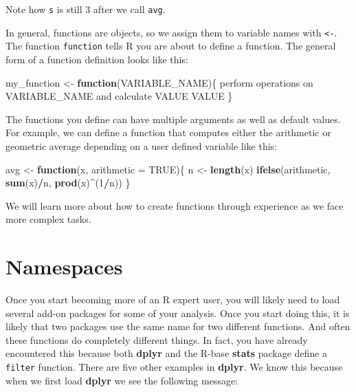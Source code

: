 \documentclass[
]{krantz}
\newenvironment{Shaded}{\begin{snugshade}}{\end{snugshade}}
\newcommand{\ControlFlowTok}[1]{\textcolor[rgb]{0.27,0.27,0.27}{\textbf{#1}}}
\newcommand{\DataTypeTok}[1]{\textcolor[rgb]{0.27,0.27,0.27}{#1}}
\newcommand{\DecValTok}[1]{\textcolor[rgb]{0.06,0.06,0.06}{#1}}
\newcommand{\KeywordTok}[1]{\textcolor[rgb]{0.27,0.27,0.27}{\textbf{#1}}}
\newcommand{\NormalTok}[1]{#1}
\newcommand{\OperatorTok}[1]{\textcolor[rgb]{0.43,0.43,0.43}{\textbf{#1}}}
\newcommand{\OtherTok}[1]{\textcolor[rgb]{0.37,0.37,0.37}{#1}}
\newcommand{\StringTok}[1]{\textcolor[rgb]{0.5,0.5,0.5}{#1}}
\begin{document}
Note how \texttt{s} is still 3 after we call \texttt{avg}.

In general, functions are objects, so we assign them to variable names with \texttt{\textless{}-}. The function \texttt{function} tells R you are about to define a function. The general form of a function definition looks like this:

\begin{Shaded}
\begin{Highlighting}[]
\NormalTok{my_function <-}\StringTok{ }\ControlFlowTok{function}\NormalTok{(VARIABLE_NAME)\{}
\NormalTok{  perform operations on VARIABLE_NAME and calculate VALUE}
\NormalTok{  VALUE}
\NormalTok{\}}
\end{Highlighting}
\end{Shaded}

The functions you define can have multiple arguments as well as default values. For example, we can define a function that computes either the arithmetic or geometric average depending on a user defined variable like this:

\begin{Shaded}
\begin{Highlighting}[]
\NormalTok{avg <-}\StringTok{ }\ControlFlowTok{function}\NormalTok{(x, }\DataTypeTok{arithmetic =} \OtherTok{TRUE}\NormalTok{)\{}
\NormalTok{  n <-}\StringTok{ }\KeywordTok{length}\NormalTok{(x)}
  \KeywordTok{ifelse}\NormalTok{(arithmetic, }\KeywordTok{sum}\NormalTok{(x)}\OperatorTok{/}\NormalTok{n, }\KeywordTok{prod}\NormalTok{(x)}\OperatorTok{^}\NormalTok{(}\DecValTok{1}\OperatorTok{/}\NormalTok{n))}
\NormalTok{\}}
\end{Highlighting}
\end{Shaded}

We will learn more about how to create functions through experience as we face more complex tasks.

\hypertarget{namespaces}{%
\section{Namespaces}\label{namespaces}}

Once you start becoming more of an R expert user, you will likely need to load several add-on packages for some of your analysis. Once you start doing this, it is likely that two packages use the same name for two different functions. And often these functions do completely different things. In fact, you have already encountered this because both \textbf{dplyr} and the R-base \textbf{stats} package define a \texttt{filter} function. There are five other examples in \textbf{dplyr}. We know this because when we first load \textbf{dplyr} we see the following message:
\end{document}
